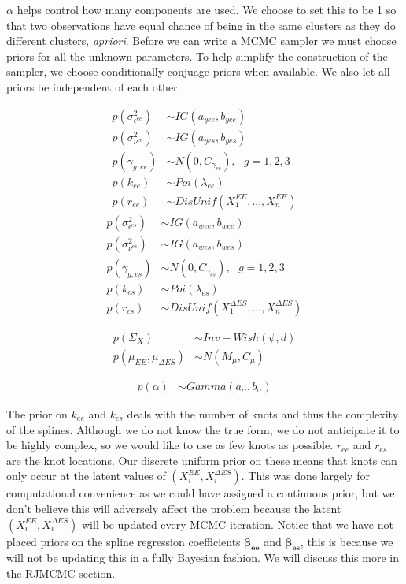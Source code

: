 \documentclass[11pt]{article}\usepackage[]{graphicx}\usepackage[]{color}
\begin{document}
$\alpha$ helps control how many components are used. We choose to set this to be  1 so that two observations have equal chance of being in the same clusters as they do different clusters, \emph{apriori}. Before we can write a MCMC sampler we must choose priors for all the unknown parameters. To help simplify the construction of the sampler, we choose conditionally conjuage priors when available.  We also let  all priors be independent of each other. 


\begin{multicols}{2}
\noindent 
  \begin{align}
  p(\sigma^2_{\epsilon^{ee}}) &\sim IG(a_{yee},b_{yee}) \\
  p(\sigma^2_{\nu^{ee}}) &\sim IG(a_{yes},b_{yes}) \\
  p(\gamma_{g,ee}) &\sim N(0,C_{\gamma_{ee}})  , \text{ } g=1,2,3 \\
  p(k_{ee}) &\sim Poi(\lambda_{ee}) \\
  p(r_{ee}) &\sim DisUnif(X_1^{EE},...,X_n^{EE})
  \end{align}
\columnbreak
  \begin{align}
  p(\sigma^2_{\epsilon^{es}}) &\sim IG(a_{wee},b_{wee}) \\
  p(\sigma^2_{\nu^{es}}) &\sim IG(a_{wes},b_{wes}) \\
  p(\gamma_{g,es}) &\sim N(0,C_{\gamma_{es}}) , \text{ } g=1,2,3 \\
  p(k_{es}) &\sim Poi(\lambda_{es}) \\
  p(r_{es}) &\sim DisUnif(X_1^{\Delta ES},...,X_n^{\Delta ES})
  \end{align}
\end{multicols}



\begin{align}
   p(\Sigma_{X}) &\sim Inv-Wish(\psi,d) \\
   p(\mu_{EE},\mu_{\Delta ES}) &\sim N(M_{\mu},C_{\mu})
\end{align}

\begin{align}
  p(\alpha) &\sim Gamma(a_{\alpha},b_{\alpha})
\end{align}


The prior on $k_{ee}$ and $k_{es}$ deals with the number of knots and thus the complexity of the splines. Although we do not know the true form, we do not anticipate it to be highly complex, so we would like to use as few knots as possible. $r_{ee}$ and $r_{es}$ are the knot locations. Our discrete uniform prior on these means that knots can only occur at the latent values of $(X_i^{EE},X_i^{\Delta ES})$. This was done largely for computational convenience as we could have assigned a continuous prior, but we don't believe this will adversely affect the problem because the latent $(X_i^{EE},X_i^{\Delta ES})$ will be updated every MCMC iteration. Notice that we have not placed priors on the spline regression coefficients $\boldsymbol{\beta_{ee}}$ and $\boldsymbol{\beta_{es}}$, this is because we will not be updating this in a fully Bayesian fashion. We will discuss this more in the RJMCMC section.
\end{document}
